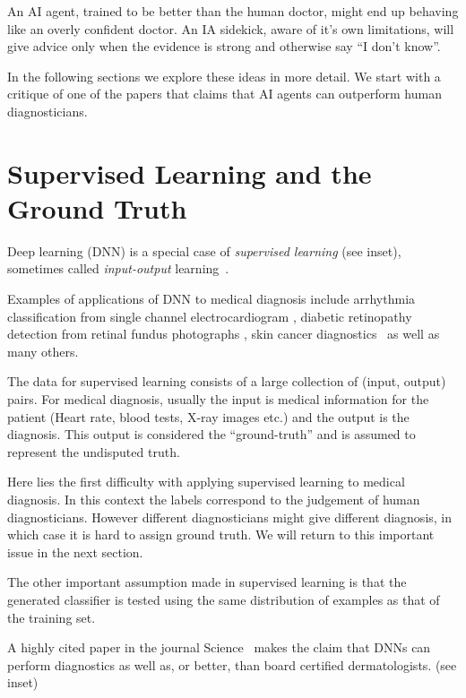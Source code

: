 \documentclass[11pt]{pnas-new}
\begin{document}
An AI agent, trained to be better than the human doctor, might end up
behaving like an overly confident doctor. An IA sidekick, aware of
it's own limitations, will give advice only when the evidence is
strong and otherwise say ``I don't know''.

In the following sections we explore these ideas in more detail. We
start with a critique of one of the papers that claims that AI agents
can outperform human diagnosticians.

\section{Supervised Learning and the Ground Truth}
\label{sec:ground-truth}

Deep learning (DNN) is a special case of {\em supervised learning} (see
inset), sometimes called {\em input-output}
learning~\cite{ng2016artificial,topol2019deep}.

Examples of applications of DNN to medical diagnosis include arrhythmia classification 
from single channel electrocardiogram \cite{hannun2019cardiologist}, diabetic retinopathy detection from retinal fundus photographs \cite{gulshan2016development}, skin cancer diagnostics~\cite{esteva2017dermatologist} as well as many others.


The data for supervised learning consists of a large collection of
(input, output) pairs. For medical diagnosis, usually the input is medical
information for the patient (Heart rate, blood tests, X-ray images
etc.) and the output is the diagnosis. This output is considered the
``ground-truth'' and is assumed to represent the undisputed truth.

Here lies the first difficulty with applying supervised learning
to medical diagnosis. In this context the labels correspond to 
the judgement of human diagnosticians. However 
different diagnosticians might give different diagnosis, in which case it is hard to assign ground truth. 
We will return to this important issue in the next section.

The other important assumption made in supervised learning is that the
generated classifier is tested using the same distribution of examples
as that of the training set.



A highly cited paper in the journal Science~\cite{esteva2017dermatologist}
makes the claim that DNNs can perform diagnostics as well as, or better, than board
certified dermatologists. (see inset)
\end{document}
